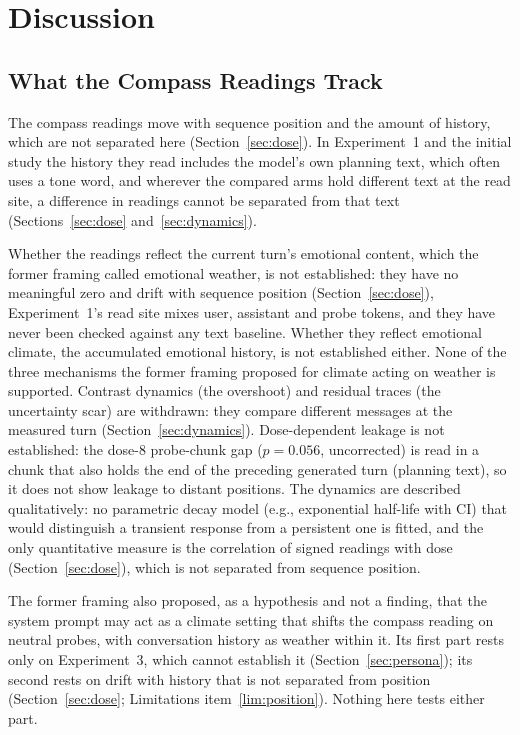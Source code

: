 \documentclass[11pt,a4paper]{article}
\begin{document}
\section{Discussion}

\subsection{What the Compass Readings Track}

The compass readings move with sequence position and the amount of
history, which are not separated here (Section~\ref{sec:dose}). In
Experiment~1 and the initial study the history they read includes the
model's own planning text, which often uses a tone word, and wherever
the compared arms hold different text at the read site, a difference in
readings cannot be separated from that text (Sections~\ref{sec:dose}
and~\ref{sec:dynamics}).

Whether the readings reflect the current turn's emotional content, which
the former framing called emotional weather, is not established: they
have no meaningful zero and drift with sequence position
(Section~\ref{sec:dose}), Experiment~1's read site mixes user, assistant
and probe tokens, and they have never been checked against any text
baseline. Whether they reflect emotional climate, the accumulated
emotional history, is not established either. None of the three
mechanisms the former framing proposed for climate acting on weather is
supported. Contrast dynamics (the overshoot) and residual traces (the
uncertainty scar) are withdrawn: they compare different messages at the measured turn
(Section~\ref{sec:dynamics}). Dose-dependent leakage is not established:
the dose-8 probe-chunk gap ($p{=}0.056$, uncorrected) is read in a chunk
that also holds the end of the preceding generated turn (planning text),
so it does not show leakage to distant positions. The dynamics are
described qualitatively: no parametric decay model (e.g., exponential
half-life with CI) that would distinguish a transient response from a
persistent one is fitted, and the only quantitative measure is the
correlation of signed readings with dose (Section~\ref{sec:dose}), which
is not separated from sequence position.

The former framing also proposed, as a hypothesis and not a finding,
that the system prompt may act as a climate setting that shifts the
compass reading on neutral probes, with conversation history as weather
within it. Its first part rests only on Experiment~3, which cannot
establish it (Section~\ref{sec:persona}); its second rests on drift with
history that is not separated from position (Section~\ref{sec:dose};
Limitations item~\ref{lim:position}). Nothing here tests either part.
\end{document}
